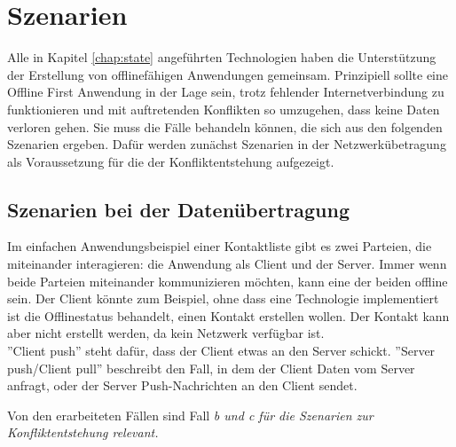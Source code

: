 \chapter{\label{chap:szenarien}Szenarien}
Alle in Kapitel \ref{chap:state} angeführten Technologien haben die Unterstützung der Erstellung von offlinefähigen Anwendungen gemeinsam.
Prinzipiell sollte eine Offline First Anwendung in der Lage sein, trotz fehlender Internetverbindung zu funktionieren und mit auftretenden Konflikten so umzugehen, dass keine Daten verloren gehen.
Sie muss die Fälle behandeln können, die sich aus den folgenden Szenarien ergeben.
Dafür werden zunächst Szenarien in der Netzwerkübetragung als Voraussetzung für die der Konfliktentstehung aufgezeigt.
%
%
\section{\label{chap:netszenarien}Szenarien bei der Datenübertragung}
Im einfachen Anwendungsbeispiel einer Kontaktliste gibt es zwei Parteien, die miteinander interagieren: die Anwendung als Client und der Server. Immer wenn beide Parteien miteinander kommunizieren möchten, kann eine der beiden offline sein.
Der Client könnte zum Beispiel, ohne dass eine Technologie implementiert ist die Offlinestatus behandelt, einen Kontakt erstellen wollen. Der Kontakt kann aber nicht erstellt werden, da kein Netzwerk verfügbar ist.\\
''Client push'' steht dafür, dass der Client etwas an den Server schickt.
''Server push/Client pull'' beschreibt den Fall, in dem der Client Daten vom Server anfragt, oder der Server Push-Nachrichten an den Client sendet.
%

Von den erarbeiteten Fällen sind Fall \it{b} und \it{c} für die Szenarien zur Konfliktentstehung relevant.
%
%
%
